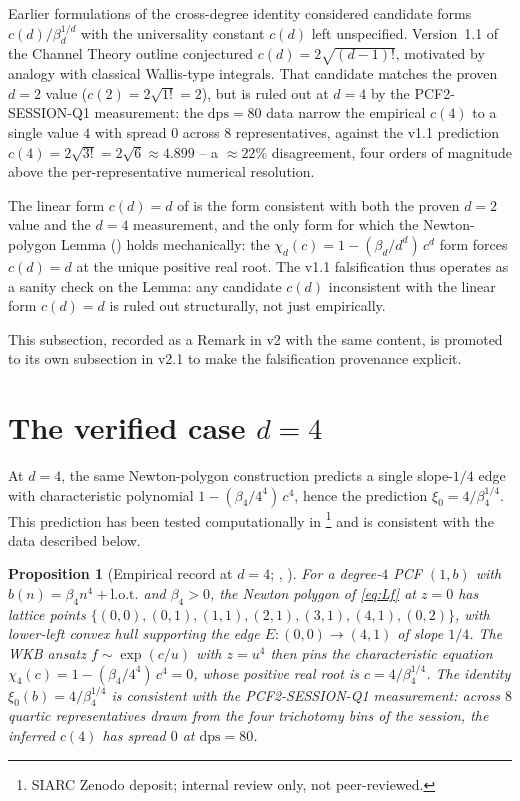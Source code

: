 \documentclass[11pt,reqno]{amsart}
\theoremstyle{plain}
\newtheorem{proposition}[theorem]{Proposition}
\theoremstyle{definition}
\theoremstyle{remark}
\newcommand{\dps}{\mathrm{dps}}
\begin{document}
Earlier formulations of the cross-degree identity considered
candidate forms $c(d) / \beta_d^{1/d}$ with the universality
constant $c(d)$ left unspecified. Version~1.1 of the Channel
Theory outline conjectured $c(d) = 2\sqrt{(d-1)!}$, motivated
by analogy with classical Wallis-type integrals. That
candidate matches the proven $d = 2$ value
($c(2) = 2\sqrt{1!} = 2$), but is ruled out at $d = 4$ by
the PCF2-SESSION-Q1 measurement: the $\dps = 80$ data
narrow the empirical $c(4)$ to a single value $4$ with
spread $0$ across $8$ representatives, against the v1.1
prediction $c(4) = 2\sqrt{3!} = 2\sqrt{6} \approx 4.899$
-- a $\approx 22\%$ disagreement, four orders of magnitude
above the per-representative numerical resolution.

The linear form $c(d) = d$ of  is the form
consistent with both the proven $d = 2$ value and the
$d = 4$ measurement, and the only form for which the
Newton-polygon Lemma () holds
mechanically: the $\chi_d(c) = 1 - (\beta_d/d^d)\,c^d$ form
forces $c(d) = d$ at the unique positive real root. The
v1.1 falsification thus operates as a sanity check on the
Lemma: any candidate $c(d)$ inconsistent with the linear
form $c(d) = d$ is ruled out structurally, not just
empirically.

This subsection, recorded as a Remark in v2 with the same
content, is promoted to its own subsection in v2.1 to make
the falsification provenance explicit.

\section{The verified case \texorpdfstring{$d = 4$}{d=4}}
\label{sec:d4}

At $d = 4$, the same Newton-polygon construction predicts a
single slope-$1/4$ edge with characteristic polynomial
$1 - (\beta_4/4^4)\,c^4$, hence the prediction
$\xi_0 = 4/\beta_4^{1/4}$. This prediction has been tested
computationally in
\cite{papanokechi_pcf2_v13}\footnote{SIARC Zenodo deposit;
internal review only, not peer-reviewed.} and is consistent
with the data described below.

\begin{proposition}[Empirical record at $d = 4$;
{\cite[Prop.~3.3.A$'$]{siarc_channel_theory_v13},
\cite{papanokechi_pcf2_v13}}]
\label{prop:xi0-d4}
For a degree-$4$ PCF $(1, b)$ with
$b(n) = \beta_4 n^4 + \mathrm{l.o.t.}$ and $\beta_4 > 0$,
the Newton polygon of \eqref{eq:Lf} at $z = 0$ has lattice
points
$\{(0,0),(0,1),(1,1),(2,1),(3,1),(4,1),(0,2)\}$, with
lower-left convex hull supporting the edge
$E:(0,0) \to (4,1)$ of slope $1/4$. The WKB ansatz
$f \sim \exp(c/u)$ with $z = u^4$ then pins the
characteristic equation
$\chi_4(c) = 1 - (\beta_4/4^4)\,c^4 = 0$, whose positive
real root is $c = 4/\beta_4^{1/4}$. The identity
$\xi_0(b) = 4/\beta_4^{1/4}$ is consistent with the
PCF2-SESSION-Q1 measurement: across $8$ quartic
representatives drawn from the four trichotomy bins of the
session, the inferred $c(4)$ has spread $0$ at $\dps = 80$.
\end{proposition}
\end{document}
